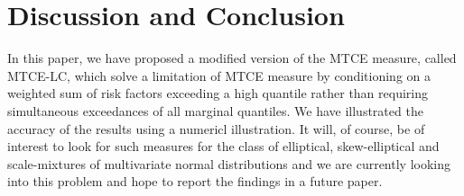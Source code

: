 \documentclass[twoside]{article}
\begin{document}
\section*{Discussion and Conclusion}   
In this paper, we have proposed a modified version of the MTCE measure,
called MTCE-LC, which solve a limitation of MTCE measure by conditioning on a
weighted sum of risk factors exceeding a high quantile rather than requiring
simultaneous exceedances of all marginal quantiles. We have illustrated the
accuracy of the results using a numericl illustration. It will, of course, be
of interest to look for such measures for the class of elliptical,
skew-elliptical and scale-mixtures of multivariate normal distributions and
we are currently looking into this problem and hope to report the findings
in a future paper.
\end{document}
